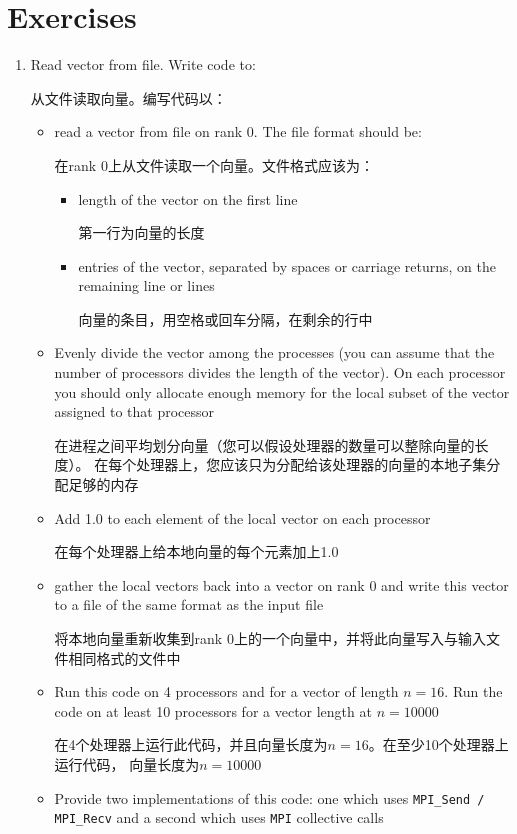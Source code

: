 \documentclass{article}
\begin{document}
\section{Exercises}
\begin{enumerate}
    \item Read vector from file. Write code to: 
    
    从文件读取向量。编写代码以：
    \begin{itemize}
        \item read a vector from file on rank 0. The file format should be:
        
        在rank 0上从文件读取一个向量。文件格式应该为：
        \begin{itemize}
            \item length of the vector on the first line 
            
            第一行为向量的长度
            \item entries of the vector, separated by spaces or carriage returns, 
            on the remaining line or lines 
            
            向量的条目，用空格或回车分隔，在剩余的行中
        \end{itemize}
        \item Evenly divide the vector among the processes (you can assume that the 
        number of processors divides the length of the vector). On each processor 
        you should only allocate enough memory for the local subset of the vector 
        assigned to that processor

        在进程之间平均划分向量（您可以假设处理器的数量可以整除向量的长度）。
        在每个处理器上，您应该只为分配给该处理器的向量的本地子集分配足够的内存
        \item Add 1.0 to each element of the local vector on each processor
        
        在每个处理器上给本地向量的每个元素加上1.0
        \item gather the local vectors back into a vector on rank 0 
        and write this vector to a file of the same format as the input file
        
        将本地向量重新收集到rank 0上的一个向量中，并将此向量写入与输入文件相同格式的文件中
        \item Run this code on 4 processors and for a vector of length $n = 16$. 
        Run the code on at least 10 processors for a vector length at $n = 10000$

        在4个处理器上运行此代码，并且向量长度为$n = 16$。在至少10个处理器上运行代码，
        向量长度为$n = 10000$
        \item Provide two implementations of this code: one which uses 
        \texttt{MPI\_Send / MPI\_Recv} and a second which uses \texttt{MPI} 
        collective calls


\end{itemize}
\end{enumerate}
\end{document}
